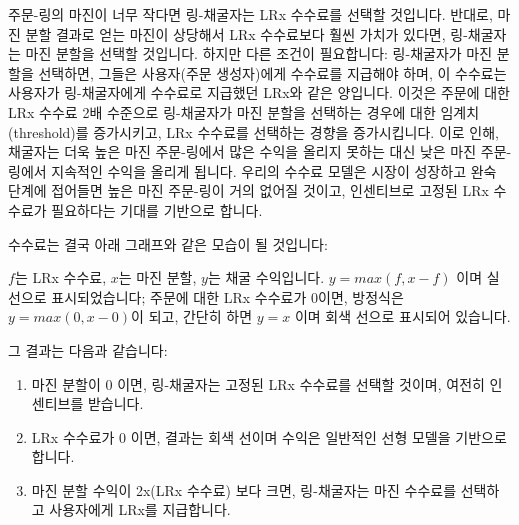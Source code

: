 \documentclass[UTF8,nofonts]{article}
\makeatletter
\newenvironment{figurehere}
 {\def\@captype{figure}}
 {}
\makeatother
\begin{document}
\begin{multicols}{2}
\begin{center}
\begin{figurehere}
\label{fig:marginsplit}
\end{figurehere}
\end{center}

주문-링의 마진이 너무 작다면 링-채굴자는 LRx 수수료를 선택할 것입니다. 반대로, 마진 분할 결과로 얻는 마진이 상당해서 LRx 수수료보다 훨씬 가치가 있다면, 링-채굴자는 마진 분할을 선택할 것입니다. 하지만 다른 조건이 필요합니다: 링-채굴자가 마진 분할을 선택하면, 그들은 사용자(주문 생성자)에게 수수료를 지급해야 하며, 이 수수료는 사용자가 링-채굴자에게 수수료로 지급했던 LRx와 같은 양입니다. 이것은 주문에 대한 LRx 수수료 2배 수준으로 링-채굴자가 마진 분할을 선택하는 경우에 대한 임계치(threshold)를 증가시키고, LRx 수수료를 선택하는 경향을 증가시킵니다. 이로 인해, 채굴자는 더욱 높은 마진 주문-링에서 많은 수익을 올리지 못하는 대신 낮은 마진 주문-링에서 지속적인 수익을 올리게 됩니다. 우리의 수수료 모델은 시장이 성장하고 완숙 단계에 접어들면 높은 마진 주문-링이 거의 없어질 것이고, 인센티브로 고정된 LRx 수수료가 필요하다는 기대를 기반으로 합니다.  

수수료는 결국 아래 그래프와 같은 모습이 될 것입니다:

\begin{center}
\begin{figurehere}
\centering
{}
\label{fig:feemodel}
\end{figurehere}
\end{center}

$f$는 LRx 수수료, $x$는 마진 분할, $y$는 채굴 수익입니다. $y=max(f, x-f)$ 이며 실선으로 표시되었습니다; 주문에 대한 LRx 수수료가 $0$이면, 방정식은 $y=max(0, x - 0)$이 되고, 간단히 하면 $y=x$ 이며 회색 선으로 표시되어 있습니다.


그 결과는 다음과 같습니다:  
\begin{enumerate}
	\item 마진 분할이 0 이면, 링-채굴자는 고정된 LRx 수수료를 선택할 것이며, 여전히 인센티브를 받습니다. 
	\item LRx 수수료가 0 이면, 결과는 회색 선이며 수익은 일반적인 선형 모델을 기반으로 합니다.
	\item 마진 분할 수익이 2x(LRx 수수료) 보다 크면, 링-채굴자는 마진 수수료를 선택하고 사용자에게 LRx를 지급합니다.
\end{enumerate}


\end{multicols}
\end{document}
